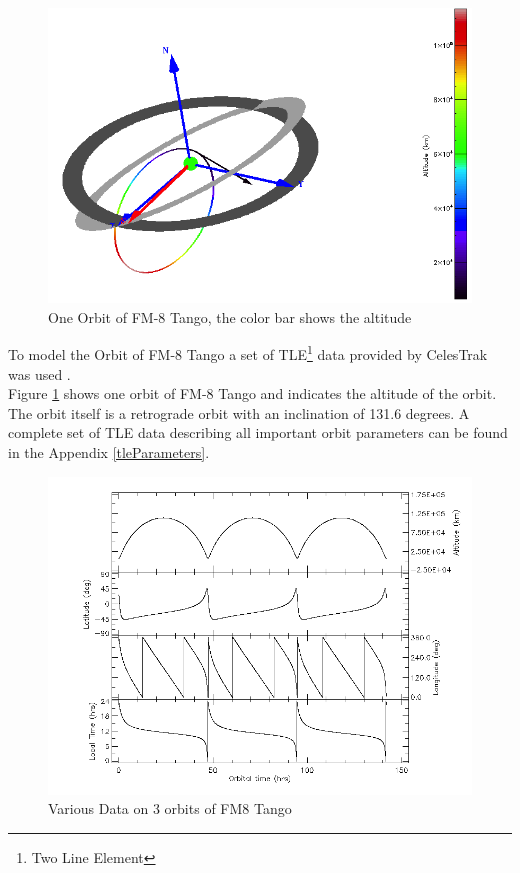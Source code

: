 \begin{figure}[h]
	\centering
	\includegraphics[width=\linewidth-5em]{spenvis/3d_gei}
		\caption{One Orbit of FM-8 Tango, the color bar shows the altitude}
	\label{fig:orbit}
\end{figure}
To model the Orbit of FM-8 Tango a set of TLE\footnote{Two Line Element} data provided by CelesTrak was used \citep{celesTrak}.\\
Figure \ref{fig:orbit} shows one orbit of FM-8 Tango and indicates the altitude of the orbit. The orbit itself is a retrograde orbit with an inclination of 131.6 degrees. A complete set of TLE data describing all important orbit parameters can be found in the Appendix \ref{tleParameters}.
\begin{figure}[h]
	\centering
	\includegraphics[width=\linewidth-5em]{spenvis/cans}
		\caption{Various Data on 3 orbits of FM8 Tango}
	\label{fig:orbitData}
\end{figure}


